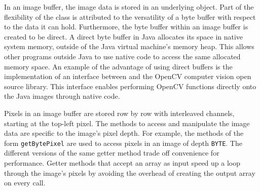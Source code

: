 In an image buffer, the image data is stored in an underlying \ByteBuffer{} object. 
Part of the flexibility of the \ImageBuffer{} class is attributed to the versatility of a byte buffer with
respect to the data it can hold. Furthermore, the byte buffer within an image buffer is created to be 
direct. A direct byte buffer in Java allocates its space in native system memory, outside of the Java 
virtual machine's memory heap. This allows other programs outside Java to use native code to access
the same allocated memory space. An example of the advantage of using direct buffers is the 
implementation of an interface between \RD{} and the OpenCV computer vision open source library.
This interface enables performing OpenCV functions directly onto the Java images through native code.

Pixels in an image buffer are stored row by row with interleaved channels, starting at the top-left pixel. 
The methods to access and manipulate the image data are specific to the image's pixel depth. For 
example, the methods of the form \texttt{get\-Byte\-Pix\-el} are used to access pixels in an image of depth 
\texttt{BYTE}. The different versions of the same getter method trade off convenience for performance. 
Getter methods that accept an array as input speed up a loop through the image's pixels by
avoiding the overhead of creating the output array on every call.
